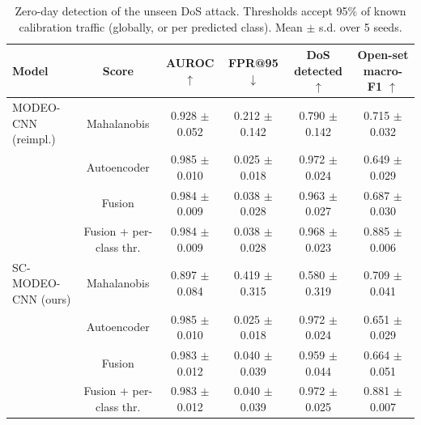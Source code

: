\begin{table}[t]
\centering
\caption{Zero-day detection of the unseen DoS attack. Thresholds accept 95\% of known calibration traffic (globally, or per predicted class). Mean $\pm$ s.d. over 5 seeds.}
\label{tab:zeroday}
\footnotesize
\begin{tabular}{lccccc}
\toprule
Model & Score & AUROC $\uparrow$ & FPR@95 $\downarrow$ & DoS detected $\uparrow$ & Open-set macro-F1 $\uparrow$ \\
\midrule
MODEO-CNN (reimpl.) & Mahalanobis & 0.928 $\pm$ 0.052 & 0.212 $\pm$ 0.142 & 0.790 $\pm$ 0.142 & 0.715 $\pm$ 0.032 \\
 & Autoencoder & 0.985 $\pm$ 0.010 & 0.025 $\pm$ 0.018 & 0.972 $\pm$ 0.024 & 0.649 $\pm$ 0.029 \\
 & Fusion & 0.984 $\pm$ 0.009 & 0.038 $\pm$ 0.028 & 0.963 $\pm$ 0.027 & 0.687 $\pm$ 0.030 \\
 & Fusion + per-class thr. & 0.984 $\pm$ 0.009 & 0.038 $\pm$ 0.028 & 0.968 $\pm$ 0.023 & 0.885 $\pm$ 0.006 \\
SC-MODEO-CNN (ours) & Mahalanobis & 0.897 $\pm$ 0.084 & 0.419 $\pm$ 0.315 & 0.580 $\pm$ 0.319 & 0.709 $\pm$ 0.041 \\
 & Autoencoder & 0.985 $\pm$ 0.010 & 0.025 $\pm$ 0.018 & 0.972 $\pm$ 0.024 & 0.651 $\pm$ 0.029 \\
 & Fusion & 0.983 $\pm$ 0.012 & 0.040 $\pm$ 0.039 & 0.959 $\pm$ 0.044 & 0.664 $\pm$ 0.051 \\
 & Fusion + per-class thr. & 0.983 $\pm$ 0.012 & 0.040 $\pm$ 0.039 & 0.972 $\pm$ 0.025 & 0.881 $\pm$ 0.007 \\
\bottomrule
\end{tabular}
\end{table}
